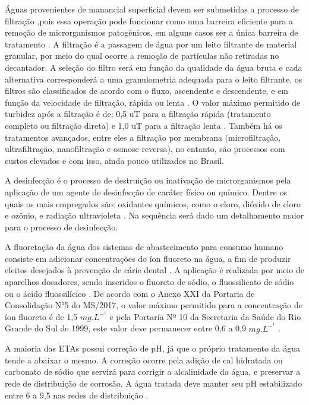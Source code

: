 Águas provenientes de manancial superficial devem ser submetidas a processo de filtração \cite{AnexoXX},pois essa operação pode funcionar como uma barreira eficiente para a remoção de microrganismos patogênicos, em alguns casos ser a única barreira de tratamento \cite{who17}. A filtração é a passagem de água por um leito filtrante de material granular, por meio do qual ocorre a remoção de partículas não retiradas no decantador. A seleção do filtro será em função da qualidade da água bruta e cada alternativa corresponderá a uma granulometria adequada para o leito filtrante, os filtros são classificados de acordo com o fluxo, ascendente e descendente, e em função da velocidade de filtração, rápida ou lenta \cite{brasilb}. O valor máximo permitido de turbidez após a filtração é de: 0,5 uT para a filtração rápida (tratamento completo ou filtração direta) e 1,0 uT para a filtração lenta \cite{AnexoXX}. Também há os tratamentos avançados, entre eles a filtração por membrana (microfiltração, ultrafiltração, nanofiltração e osmose reversa), no entanto, são processos com custos elevados e com isso, ainda pouco utilizados no Brasil.

A desinfecção é o processo de destruição ou inativação de microrganismos pela aplicação de um agente de desinfecção de caráter físico ou químico. Dentre os quais os mais empregados são: oxidantes químicos, como o cloro, dióxido de cloro e ozônio, e radiação ultravioleta  \cite{brasilb}. Na sequência será dado um detalhamento maior para o processo de desinfecção.

A fluoretação da água dos sistemas de abastecimento para consumo humano consiste em adicionar concentrações do íon fluoreto na água, a fim de produzir efeitos desejados à prevenção de cárie dental \cite{AnexoXX}. A aplicação é realizada por meio de aparelhos dosadores, sendo inseridos o fluoreto de sódio, o fluossilicato de sódio ou o ácido fluossilícico \cite{brasilb}.  De acordo com o Anexo XXI da Portaria de Consolidação N°5 do MS/2017, o valor máximo permitido para a concentração de íon fluoreto é de 1,5 $mg.L^-^1$ \cite{AnexoXX} e pela Portaria Nº 10 da Secretaria da Saúde do Rio Grande do Sul de 1999, este valor deve permanecer entre 0,6 a 0,9 $mg.L^-^1$ \cite{ses99}.

A maioria das ETAs possui correção de pH, já que o próprio tratamento da água tende a abaixar o mesmo. A correção ocorre pela adição de cal hidratada ou carbonato de sódio que servirá para corrigir a alcalinidade da água, e preservar a rede de distribuição de corrosão. A água tratada deve manter seu pH estabilizado entre 6 a 9,5 nas redes de distribuição \cite{brasilb}.


